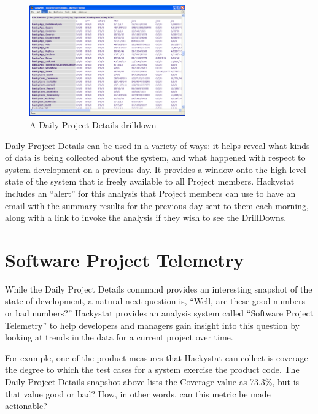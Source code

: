 \documentclass[12pt]{article}
\begin{document}
\begin{figure}[t]
  \centering
  \includegraphics[width=0.60\textwidth]{dpd.drilldown.eps}
  \caption{A Daily Project Details drilldown}
  \label{fig:dpd.drilldown}
\end{figure}

Daily Project Details can be used in a variety of ways: it helps reveal
what kinds of data is being collected about the system, and what happened
with respect to system development on a previous day.  It provides a window
onto the high-level state of the system that is freely available to all
Project members.  Hackystat includes an ``alert'' for this analysis that
Project members can use to have an email with the summary results for the
previous day sent to them each morning, along with a link to invoke the
analysis if they wish to see the DrillDowns.

\section{Software Project Telemetry}

While the Daily Project Details command provides an interesting snapshot of
the state of development, a natural next question is, ``Well, are these
good numbers or bad numbers?''  Hackystat provides an analysis system
called ``Software Project Telemetry'' to help developers and managers gain
insight into this question by looking at trends in the data for a current project over time. 

For example, one of the product measures that Hackystat can collect is coverage--the 
degree to which the test cases for a system exercise the product code. The Daily
Project Details snapshot above lists the Coverage value as 73.3\%, but is that value
good or bad?  How, in other words, can this metric be made actionable? 
\end{document}

